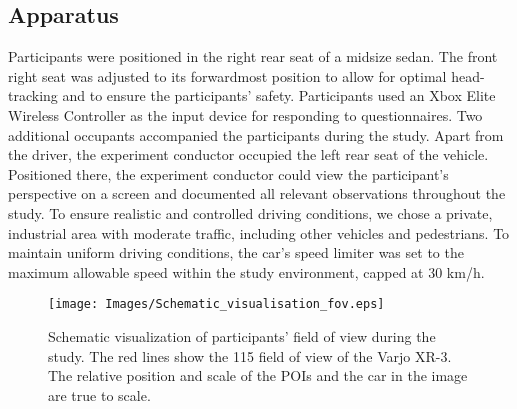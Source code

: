 \subsection{Apparatus}
\label{sec:apparatus}
Participants were positioned in the right rear seat of a midsize sedan. The front right seat was adjusted to its forwardmost position to allow for optimal head-tracking and to ensure the participants' safety. Participants used an Xbox Elite Wireless Controller as the input device for responding to questionnaires. Two additional occupants accompanied the participants during the study. Apart from the driver, the experiment conductor occupied the left rear seat of the vehicle. Positioned there, the experiment conductor could view the participant's perspective on a screen and documented all relevant observations throughout the study. To ensure realistic and controlled driving conditions, we chose a private, industrial area with moderate traffic, including other vehicles and pedestrians. To maintain uniform driving conditions, the car's speed limiter was set to the maximum allowable speed within the study environment, capped at 30 km/h.

\begin{figure}[ht]
    \centering
    \texttt{[image: Images/Schematic\_visualisation\_fov.eps]}
    \caption{Schematic visualization of participants' field of view during the study. The red lines show the 115\textdegree{} field of view of the Varjo XR-3. The relative position and scale of the POIs and the car in the image are true to scale.}
    \label{fig:TopdownSchematics}
\end{figure}



